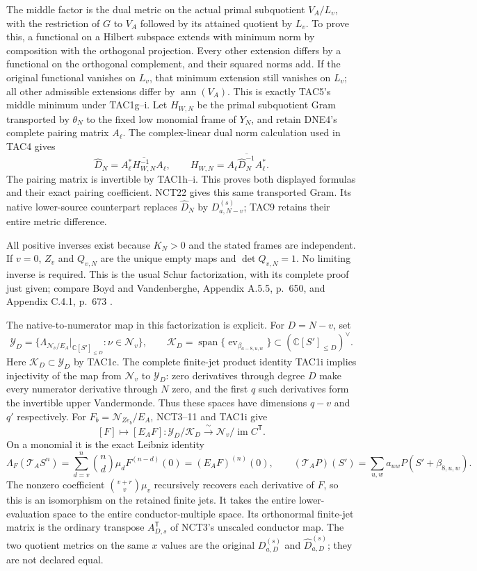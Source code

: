 \documentclass[11pt,a4paper]{article}
\begin{document}
The middle factor is the dual metric on the actual primal subquotient
$V_A/L_v$, with the restriction of $G$ to $V_A$ followed by its
attained quotient by $L_v$. To prove this, a functional on a Hilbert
subspace extends with minimum norm by composition with the orthogonal
projection. Every other extension differs by a functional on the
orthogonal complement, and their squared norms add. If the original
functional vanishes on $L_v$, that minimum extension still vanishes
on $L_v$; all other admissible extensions differ by
$\operatorname{ann}(V_A)$. This is exactly TAC5's middle minimum
under TAC1g--i. Let $H_{W,N}$ be the primal subquotient Gram transported
by $\theta_N$ to the fixed low monomial frame of $Y_N$, and retain
DNE4's complete pairing matrix $A_\ell$. The complex-linear dual
norm calculation used in TAC4 gives
\[
 \widehat D_N=A_\ell^*\overline{H_{W,N}^{-1}}A_\ell,
 \qquad H_{W,N}=\overline{A_\ell\widehat D_N^{-1}A_\ell^*}.
 \tag{TAC6c}
\]
The pairing matrix is invertible by TAC1h--i. This proves both displayed
formulas and their exact pairing coefficient. NCT22 gives this same
transported Gram. Its native lower-source counterpart replaces
$\widehat D_N$ by $D_{a,N-v}^{(s)}$; TAC9 retains their entire
metric difference.

All positive inverses exist because $K_N>0$ and the stated frames are
independent.  If $v=0$, $Z_v$ and $Q_{v,N}$ are the unique empty maps
and $\det Q_{v,N}=1$.  No limiting inverse is required.
This is the usual Schur factorization, with its complete proof just
given; compare Boyd and Vandenberghe, Appendix A.5.5, p.~650, and
Appendix C.4.1, p.~673 \cite{human:boyd-vandenberghe}.

The native-to-numerator map in this factorization is explicit.
For $D=N-v$, set
\[
 \mathscr Y_D=\{\Lambda_{\mathcal N_\nu/E_A}|_{\mathbb C[S']_{\le D}}
                           :\nu\in\mathscr N_v\},\qquad
 \mathscr K_D=\operatorname{span}\{\operatorname{ev}_{\beta_{a-8,u,w}}\}
                    \subset(\mathbb C[S']_{\le D})^\vee.
\]
Here $\mathscr K_D\subset\mathscr Y_D$ by TAC1c. The complete
finite-jet product identity TAC1i implies injectivity of the map from
$\mathscr N_v$ to $\mathscr Y_D$: zero derivatives through degree
$D$ make every numerator derivative through $N$ zero, and the first
$q$ such derivatives form the invertible upper Vandermonde.
Thus these spaces have dimensions $q-v$ and $q'$ respectively.
For $F_b=\mathcal N_{Ze_b}/E_A$, NCT3--11 and TAC1i give
\[
 [F]\longmapsto[E_AF]:
 \mathscr Y_D/\mathscr K_D
 \xrightarrow{\ \sim\ }
 \mathscr N_v/\operatorname{im}C^{\mathsf T}.
 \tag{TAC7}
\]
On a monomial it is the exact Leibniz identity
\[
 \Lambda_F(\mathcal T_AS^n)
 =\sum_{d=v}^n\binom nd\mu_dF^{(n-d)}(0)
 =(E_AF)^{(n)}(0),\qquad
 (\mathcal T_AP)(S')=\sum_{u,w}a_{uw}P(S'+\beta_{8,u,w}).
\]
The nonzero coefficient $\binom{v+r}{v}\mu_v$ recursively recovers
each derivative of $F$, so this is an isomorphism on the retained finite
jets.  It takes the entire lower-evaluation space to the entire
conductor-multiple space.  Its orthonormal finite-jet matrix is the
ordinary transpose $A_{D,s}^{\mathsf T}$ of NCT3's unscaled conductor
map.  The two quotient metrics on the same $x$ values are the original
$D_{a,D}^{(s)}$ and $\widehat D_{a,D}^{(s)}$; they are not declared equal.
\end{document}
